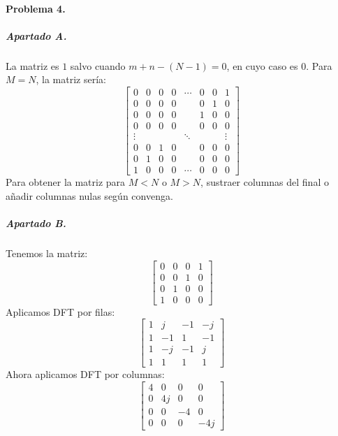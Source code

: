 \finishpage


\startpage

\paragraph{Problema 4.}

\subparagraph{Apartado A.}

La matriz es $1$ salvo cuando $m + n - (N - 1) = 0$, en cuyo caso es $0$.
Para $M = N$, la matriz sería:
%
\begin{equation*}
  \begin{bmatrix}
    0 & 0 & 0 & 0 & \cdots & 0 & 0 & 1 \\
    0 & 0 & 0 & 0 &        & 0 & 1 & 0 \\
    0 & 0 & 0 & 0 &        & 1 & 0 & 0 \\
    0 & 0 & 0 & 0 &        & 0 & 0 & 0 \\

    \vdots  & & & & \ddots & & & \vdots\\

    0 & 0 & 1 & 0 &        & 0 & 0 & 0 \\
    0 & 1 & 0 & 0 &        & 0 & 0 & 0 \\
    1 & 0 & 0 & 0 & \cdots & 0 & 0 & 0
  \end{bmatrix}
\end{equation*}
%
Para obtener la matriz para $M < N$ o $M > N$, sustraer columnas del final o añadir
columnas nulas según convenga.

\subparagraph{Apartado B.}

Tenemos la matriz:
%
\begin{equation*}
  \begin{bmatrix}
    0 & 0 & 0 & 1 \\
    0 & 0 & 1 & 0 \\
    0 & 1 & 0 & 0 \\
    1 & 0 & 0 & 0
  \end{bmatrix}
\end{equation*}
%
Aplicamos DFT por filas:
%
\begin{equation*}
  \begin{bmatrix}
     1 &  j & -1 & -j \\
     1 & -1 &  1 & -1 \\
     1 & -j & -1 &  j \\
     1 &  1 &  1 &  1
  \end{bmatrix}
\end{equation*}
%
Ahora aplicamos DFT por columnas:
%
\begin{equation*}
  \begin{bmatrix}
     4 &  0 &  0 &  0 \\
     0 & 4j &  0 &  0 \\
     0 &  0 & -4 &  0 \\
     0 &  0 &  0 & -4j
  \end{bmatrix}
\end{equation*}
%

\finishpage

